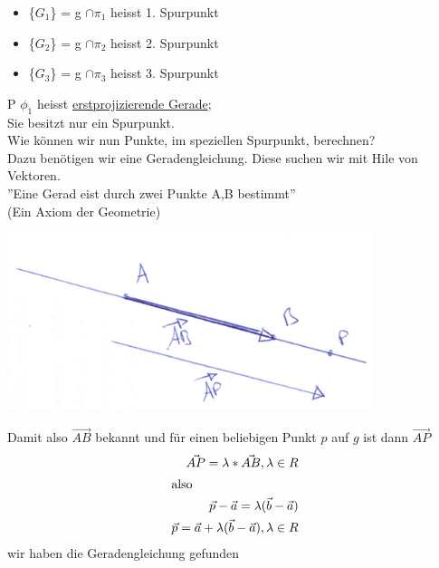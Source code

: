 \begin{itemize}
	\item
		\{$G_1$\} = g $\cap \pi_1$ heisst 1. Spurpunkt
	\item
		\{$G_2$\} = g $\cap \pi_2$ heisst 2. Spurpunkt
	\item
		\{$G_3$\} = g $\cap \pi_3$ heisst 3. Spurpunkt
\end{itemize}
P $\phi_1$ heisst \underline{erstprojizierende Gerade};\\
Sie besitzt nur ein Spurpunkt.\\
Wie können wir nun Punkte, im speziellen Spurpunkt, berechnen?\\
Dazu benötigen wir eine Geradengleichung. Diese suchen wir mit Hile von Vektoren.\\
''Eine Gerad eist durch zwei Punkte A,B bestimmt'' \\
(Ein Axiom der Geometrie)
\begin{center}
	 \includegraphics[width=0.8\textwidth]{imgs/geradengleichung.png}
 \end{center}
Damit also $\vec{AB}$ bekannt und für einen beliebigen Punkt  $p$ auf $g$ ist dann $\vec{AP}$
\begin{eqnarray*}
	\vec{AP} = \lambda * \vec{AB}, \lambda \in R\\
	\shortintertext{also}
	\vec{p} - \vec{a} = \lambda(\vec{b} - \vec{a})\\
	\vec{p} = \vec{a} + \lambda(\vec{b} - \vec{a}), \lambda \in R
\end{eqnarray*}
wir haben die Geradengleichung gefunden

